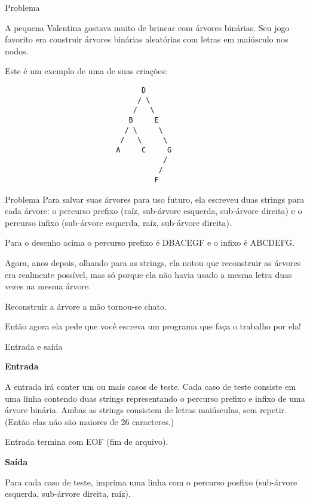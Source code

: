 
\begin{frame}[fragile]{Problema}

A pequena Valentina gostava muito de brincar com árvores binárias. Seu jogo favorito era construir árvores binárias aleatórias com letras em maiúsculo nos nodos.

Este é um exemplo de uma de suas criações:
 
\begin{verbatim}
                                D
                               / \
                              /   \
                             B     E
                            / \     \
                           /   \     \
                          A     C     G
                                     /
                                    /
                                   F
\end{verbatim}
\end{frame}
 

\begin{frame}[fragile]{Problema}
Para salvar suas árvores para uso futuro, ela escreveu duas strings para cada árvore: o percurso prefixo (raíz, sub-árvore esquerda, sub-árvore direita) e o percurso infixo (sub-árvore esquerda, raíz, sub-árvore direita).

Para o desenho acima o percurso prefixo é DBACEGF e o infixo é ABCDEFG.

Agora, anos depois, olhando para as strings, ela notou que reconstruir as árvores era realmente possível, mas só porque ela não havia usado a mesma letra duas vezes na mesma árvore.

Reconstruir a árvore a mão tornou-se chato.

Então agora ela pede que você escreva um programa que faça o trabalho por ela!

\end{frame}

\begin{frame}[fragile]{Entrada e saída}

\textbf{Entrada}

A entrada irá conter um ou mais casos de teste. Cada caso de teste consiste em uma linha contendo duas strings representando o percurso prefixo e infixo de uma árvore binária. Ambas as strings consistem de letras maiúsculas, sem repetir. (Então elas não são maiores de 26 caracteres.)

Entrada termina com EOF (fim de arquivo).

\vspace{0.2in}

\textbf{Saída}

Para cada caso de teste, imprima uma linha com o percurso posfixo (sub-árvore esquerda, sub-árvore direita, raíz).

\end{frame}



